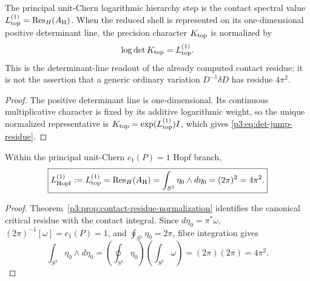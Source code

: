 \documentclass[12pt,a4paper]{article}
\begin{document}
\begin{lemma}
\label{p3:lem:sharp-threshold-determinant-jump}
The principal unit-Chern logarithmic hierarchy step is the contact spectral value
\(L_{\rm top}^{(1)}=\operatorname{Res}_{H}(A_{\rm H})\).  When the reduced
shell is represented on its one-dimensional positive determinant line, the
precision character \(K_{\rm top}\) is normalized by
\begin{equation}
\label{p3:eq:det-jump-residue}
 \log\det K_{\rm top}=L_{\rm top}^{(1)}.
\end{equation}
This is the determinant-line readout of the already computed contact residue;
it is not the assertion that a generic ordinary variation
\(D^{-1}\delta D\) has residue \(4\pi^2\).
\end{lemma}

\begin{proof}
The positive determinant line is one-dimensional.  Its continuous
multiplicative character is fixed by its additive logarithmic weight, so the
unique normalized representative is
\(K_{\rm top}=\exp(L_{\rm top}^{(1)})I\), which gives
\eqref{p3:eq:det-jump-residue}.
\end{proof}

\begin{theorem}[Unit-charge Hopf contact-residue theorem: \texorpdfstring{$L_{\rm top}^{(1)}=(2\pi)^2$}{Ltop=(2pi)^2}]
\label{p3:thm:Vlog}
Within the principal unit-Chern \(c_1(P)=1\) Hopf branch,
\begin{equation}
\boxed{
 L_{\mathrm{Hopf}}^{(1)}
 :=L_{\rm top}^{(1)}
 =\operatorname{Res}_{H}(A_{\rm H})
 =\int_{S^3}\eta_0\wedge d\eta_0
 =(2\pi)^2
 =4\pi^2 .}
\end{equation}
\end{theorem}

\begin{proof}
Theorem~\ref{p3:prop:contact-residue-normalization} identifies the canonical
critical residue with the contact integral.  Since
\(d\eta_0=\pi^*\omega\),
\((2\pi)^{-1}[\omega]=c_1(P)=1\), and
\(\oint_{S^1}\eta_0=2\pi\), fibre integration gives
\[
 \int_{S^3}\eta_0\wedge d\eta_0
 =\left(\oint_{S^1}\eta_0\right)
  \left(\int_{S^2}\omega\right)
 =(2\pi)(2\pi)=4\pi^2.
\]
\end{proof}
\end{document}
